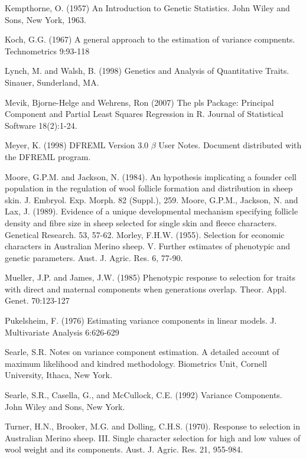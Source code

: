 \documentclass[titlepage]{article}  %
\begin{document}
\begin{thebibliography}{99}
Kempthorne, O. (1957) An Introduction to Genetic Statistics.
    John Wiley and Sons, New York, 1963.

Koch, G.G. (1967) A general approach to the estimation of variance compnents. 
    Technometrics 9:93-118

Lynch, M. and Walsh, B. (1998) Genetics and Analysis of Quantitative Traits. 
    Sinauer, Sunderland, MA.

Mevik, Bjorne-Helge and Wehrens, Ron (2007) The pls Package: Principal 
    Component and Partial Least Squares Regression in R.
    Journal of Statistical Software 18(2):1-24.

Meyer, K. (1998) DFREML Version 3.0 $\beta$ User Notes. Document distributed
    with the DFREML program.

Moore, G.P.M. and Jackson, N. (1984).  An hypothesis implicating a founder
    cell population in the regulation of wool follicle formation and
    distribution in sheep skin.  J. Embryol. Exp. Morph. 82 (Suppl.), 259.
Moore, G.P.M., Jackson, N. and Lax, J. (1989).  Evidence of a unique
    developmental mechanism specifying follicle density and fibre size in
    sheep selected for single skin and fleece characters.  Genetical
    Research.  53, 57-62.
Morley, F.H.W. (1955).  Selection for economic characters in Australian
    Merino sheep.  V. Further estimates of phenotypic and genetic
    parameters.  Aust. J. Agric. Res. 6, 77-90.

Mueller, J.P. and James, J.W. (1985) Phenotypic response to selection for
    traits with direct and maternal components when generations overlap.
    Theor. Appl. Genet. 70:123-127

Pukelsheim, F. (1976) Estimating variance components in linear models.
    J. Multivariate Analysis 6:626-629

Searle, S.R. Notes on variance component estimation. A detailed account of 
    maximum likelihood and kindred methodology. Biometrics Unit, Cornell
    University, Ithaca, New York.

Searle, S.R., Casella, G., and McCullock, C.E. (1992) Variance Components.
    John Wiley and Sons, New York.

Turner, H.N., Brooker, M.G. and Dolling, C.H.S. (1970).  Response to
    selection in Australian Merino sheep. III.  Single character selection
    for high and low values of wool weight and its components.  Aust. J.
    Agric. Res. 21, 955-984.


\end{thebibliography}
\end{document}

